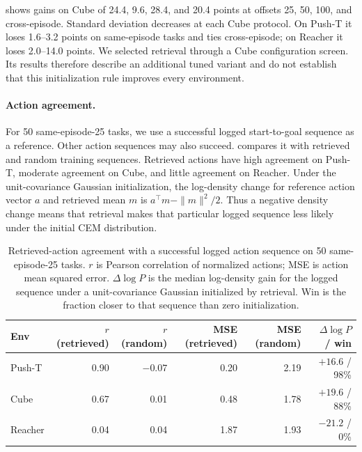 \documentclass{article}
\theoremstyle{definition}
\theoremstyle{remark}
\begin{document}
 shows gains on Cube of 24.4, 9.6, 28.4, and 20.4 points at
offsets 25, 50, 100, and cross-episode. Standard deviation decreases at each Cube
protocol. On Push-T it loses 1.6--3.2 points on same-episode tasks and ties
cross-episode; on Reacher it loses 2.0--14.0 points.
We selected retrieval through a Cube configuration screen. Its results therefore
describe an additional tuned variant and do not establish that this initialization
rule improves every environment.

\paragraph{Action agreement.}
For 50 same-episode-25 tasks, we use a successful logged start-to-goal sequence as a
reference. Other action sequences may also succeed.
 compares it with retrieved and random training sequences.
Retrieved actions have high agreement on Push-T, moderate agreement on Cube, and
little agreement on Reacher. Under the unit-covariance Gaussian initialization,
the log-density change for reference action vector $a$ and retrieved mean $m$ is
$a^\top m-\|m\|^2/2$.
Thus a negative density change means that retrieval makes that particular logged
sequence less likely under the initial CEM distribution.
\begin{table}[h]
\centering\small
\caption{Retrieved-action agreement with a successful logged action sequence on 50 same-episode-25 tasks. $r$ is Pearson correlation of normalized actions; MSE is action mean squared error. $\Delta\log P$ is the median log-density gain for the logged sequence under a unit-covariance Gaussian initialized by retrieval. Win is the fraction closer to that sequence than zero initialization.}
\label{tab:retrieval-quality}
\begin{tabular}{lrrrrr}
\toprule
Env & $r$ (retrieved) & $r$ (random) & MSE (retrieved) & MSE (random) & $\Delta\log P$ / win \\
\midrule
Push-T  & 0.90 & $-0.07$ & 0.20 & 2.19 & $+16.6$ / 98\% \\
Cube    & 0.67 & 0.01    & 0.48 & 1.78 & $+19.6$ / 88\% \\
Reacher & 0.04 & 0.04    & 1.87 & 1.93 & $-21.2$ / 0\% \\
\bottomrule
\end{tabular}
\end{table}
\end{document}
